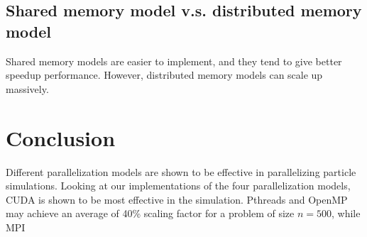 \documentclass[11pt]{article}
\begin{document}
\subsection{Shared memory model v.s. distributed memory model}
Shared memory models are easier to implement, and they tend to give better speedup performance. However, distributed memory models can scale up massively.

\section{Conclusion}
Different parallelization models are shown to be effective in parallelizing particle simulations. Looking at our implementations of the four parallelization models, CUDA is shown to be most effective in the simulation. Pthreads and OpenMP may achieve an average of 40\% scaling factor for a problem of size $n = 500$, while MPI 



\end{document}
